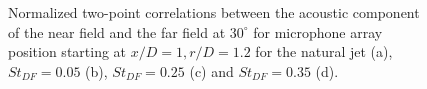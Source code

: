 \documentclass[english]{aiaa-tc}
\begin{document}
\begin{figure}
	\begin{centering}
		
	\end{centering}
	\caption{Normalized two-point correlations between the acoustic component of the near field and the far field at $30^\circ$ for microphone array position starting at $x/D = 1, r/D = 1.2$ for the natural jet (a), $St_{DF} = 0.05$ (b), $St_{DF} = 0.25$ (c) and $St_{DF} = 0.35$ (d).}
	\label{fig:exp_xcorrOA}
\end{figure}
\end{document}
